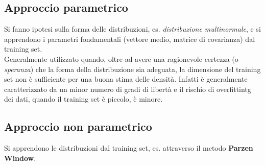 \subsection{Approccio parametrico}\label{sec:approccio_parametrico} %
Si fanno ipotesi sulla forma delle distribuzioni, es. \textit{distribuzione multinormale}, e si apprendono i parametri fondamentali (vettore medio, matrice di covarianza) dal training set.
\\
Generalmente utilizzato quando, oltre ad avere una ragionevole certezza (o \textit{speranza}) che la forma della distribuzione sia adeguata, la dimensione del training set non è sufficiente per una buona stima delle densità.
Infatti è generalmente caratterizzato da un minor numero di gradi di libertà e il rischio di overfittintg dei dati, quando il training set è piccolo, è minore.
%
\subsection{Approccio non parametrico}\label{sec:approccio_non_parametrico} %
Si apprendono le distribuzioni dal training set, es. attraverso il metodo \textbf{Parzen Window}.
%
